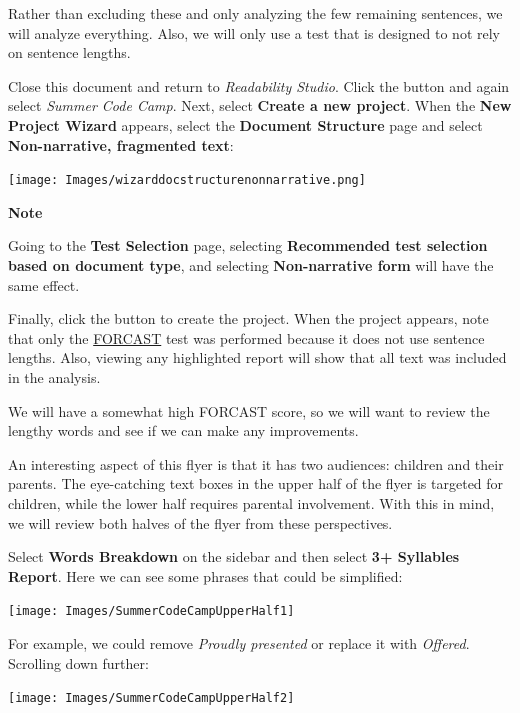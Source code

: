 \documentclass[
]{book}
\newenvironment{notesection}
    {
    \begin{tcolorbox}[colframe=mediumblue,colback=lightblue,coltext=mediumblue,arc=3mm]
    \faLightbulb[regular] \textbf{Note} \newline
    }
    {
    \end{tcolorbox}
    }
\theoremstyle{definition}
\theoremstyle{definition}
\theoremstyle{definition}
\theoremstyle{definition}
\theoremstyle{remark}
\begin{document}
Rather than excluding these and only analyzing the few remaining sentences, we will analyze everything. Also, we will only use a test that is designed to not rely on sentence lengths.

Close this document and return to \emph{Readability Studio}. Click the  button and again select \emph{Summer Code Camp}. Next, select \textbf{Create a new project}. When the \textbf{New Project Wizard} appears, select the \textbf{Document Structure} page and select \textbf{Non-narrative, fragmented text}:

\texttt{[image: Images/wizarddocstructurenonnarrative.png]}

\begin{notesection}
Going to the \textbf{Test Selection} page, selecting \textbf{Recommended test selection based on document type}, and selecting \textbf{Non-narrative form} will have the same effect.

\end{notesection}

Finally, click the  button to create the project. When the project appears, note that only the \protect\hyperlink{forcast-test}{FORCAST} test was performed because it does not use sentence lengths. Also, viewing any highlighted report will show that all text was included in the analysis.

We will have a somewhat high FORCAST score, so we will want to review the lengthy words and see if we can make any improvements.

An interesting aspect of this flyer is that it has two audiences: children and their parents. The eye-catching text boxes in the upper half of the flyer is targeted for children, while the lower half requires parental involvement. With this in mind, we will review both halves of the flyer from these perspectives.

Select \textbf{Words Breakdown} on the sidebar and then select \textbf{3+ Syllables Report}. Here we can see some phrases that could be simplified:

\begin{center}\texttt{[image: Images/SummerCodeCampUpperHalf1]} \end{center}

For example, we could remove \emph{Proudly presented} or replace it with \emph{Offered}. Scrolling down further:

\begin{center}\texttt{[image: Images/SummerCodeCampUpperHalf2]} \end{center}
\end{document}

